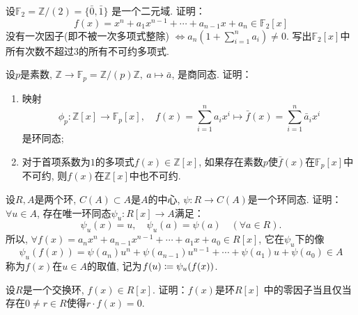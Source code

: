 \begin{problem}
    设$\mathbb{F}_2 = \mathbb{Z}/(2) = \{\bar{0}, \bar{1}\}$
是一个二元域. 证明：
\[
    f(x) = x^n + a_1x^{n - 1} + \cdots + a_{n - 1}x + a_n \in \mathbb{F}_2[x]
\]
没有一次因子(即不被一次多项式整除)
\(
    \Leftrightarrow a_n\left(1 + \sum_{i = 1}^n a_i\right) \neq 0.
\)
写出$\mathbb{F}_2[x]$中所有次数不超过$3$的所有不可约多项式.
\end{problem}

\begin{solution}
    
\end{solution}

\begin{problem}
    设$p$是素数, $\mathbb{Z} \to \mathbb{F}_p = \mathbb{Z}/(p)\mathbb{Z},~a \mapsto \bar{a}$,
是商同态. 证明：
\begin{enumerate}[(1)]
    \item 映射
\[
    \phi_p:\mathbb{Z}[x] \to \mathbb{F}_p[x],\quad f(x) = \sum_{i = 1}^n a_ix^i \mapsto \bar{f}(x) = \sum_{i = 1}^n \bar{a}_ix^i
\]
是环同态;
    \item 对于首项系数为$1$的多项式$f(x) \in \mathbb{Z}[x]$,
如果存在素数$p$使$\bar{f}(x)$在$\mathbb{F}_p[x]$中不可约, 
则$f(x)$在$\mathbb{Z}[x]$中也不可约.
\end{enumerate}
\end{problem}

\begin{solution}
    
\end{solution}

\begin{problem}
    设$R, A$是两个环, $C(A) \subset A$是$A$的中心,
$\psi:R \to C(A)$是一个环同态. 证明：$\forall u \in A$,
存在唯一环同态$\psi_u:R[x] \to A$满足：
\[
    \psi_u(x) = u,\quad \psi_u(a) = \psi(a) \quad (\forall a \in R).
\]
所以, $\forall f(x) = a_nx^n + a_{n - 1}x^{n - 1} + \cdots + a_1x + a_0 \in R[x]$,
它在$\psi_u$下的像
\[
    \psi_u(f(x)) = \psi(a_n)u^n + \psi(a_{n - 1})u^{n - 1} + \cdots + \psi(a_1)u + \psi(a_0) \in A
\]
称为$f(x)$在$u \in A$的取值, 记为$f(u) \mathrel{\coloneqq} \psi_u(f(x))$.
\end{problem}

\begin{solution}
    
\end{solution}

\begin{problem}
    设$R$是一个交换环, $f(x) \in R[x]$. 证明：$f(x)$是环$R[x]$
中的零因子当且仅当存在$0 \neq r \in R$使得$r \cdot f(x) = 0$.
\end{problem}

